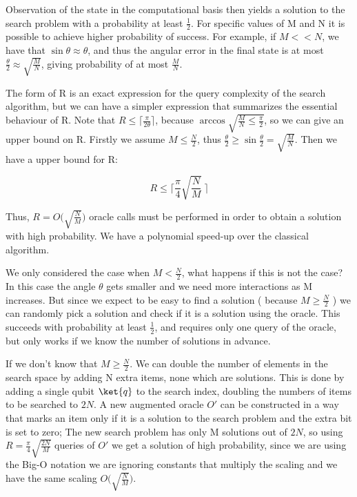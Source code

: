 Observation of the state in the computational basis then yields a solution to the search problem with a probability at least $\frac{1}{2}$. For specific values of M and N it is possible to achieve higher probability of success. For example, if $M << N$, we have that $\sin \theta \approx \theta$, and thus the angular error in the final state is at most $\frac{\theta}{2} \approx \sqrt{\frac{M}{N}}$, giving probability of at most $\frac{M}{N}$.

The form of R is an exact expression for the query complexity of the search algorithm, but we can have a simpler expression that summarizes the essential behaviour of R. Note that $R \leq \lceil \frac{\pi}{2 \theta} \rceil$, because $\arccos \sqrt{\frac{M}{N} \leq \frac{\pi}{2}}$, so we can give an upper bound on R. Firstly we assume $M \leq \frac{N}{2}$, thus $\frac{\theta}{2} \geq \sin \frac{\theta}{2} = \sqrt{\frac{M}{N}}$. Then we have a upper bound for R:

\begin{equation}
    R \leq \bigg\lceil \frac{\pi}{4} \sqrt{\frac{
    N}{M}} \ \bigg\rceil
\end{equation}

Thus, $R = O\big( \sqrt{\frac{N}{M}} \big)$ oracle calls must be performed in order to obtain a solution with high probability. We have a polynomial speed-up over the classical algorithm.

We only considered the case when $M < \frac{N}{2}$, what happens if this is not the case? In this case the angle $\theta$ gets smaller and we need more interactions as M increases. But since we expect to be easy to find a solution ( because $M \geq \frac{N}{2}$ ) we can randomly pick a solution and check if it is a solution using the oracle. This succeeds with probability at least $\frac{1}{2}$, and requires only one query of the oracle, but only works if we know the number of solutions in advance.

If we don't know that $M \geq \frac{N}{2}$. We can double the number of elements in the search space by adding N extra items, none which are solutions. This is done by adding a single qubit $\ket{q}$ to the search index, doubling the numbers of items to be searched to $2N$. A new augmented oracle $O'$ can be constructed in a way that marks an item only if it is a solution to the search problem and the extra bit is set to zero; The new search problem has only M solutions out of $2N$, so using $R = \frac{\pi}{4} \sqrt{\frac{2N}{M}}$ queries of $O'$ we get a solution of high probability, since we are using the Big-O notation  we are ignoring constants that multiply the scaling and we have the same scaling $O \big( \sqrt{\frac{N}{M}} \big)$.

